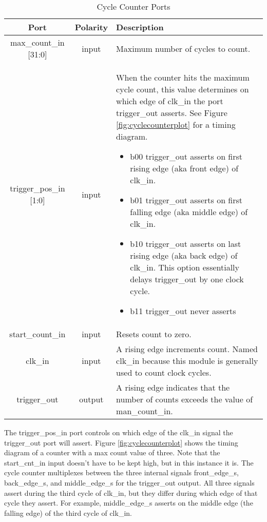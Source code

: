 \documentclass[]{report}
\begin{document}
\begin{table}[h]
	\centering
	\caption{Cycle Counter Ports}
	\label{table: cyc cnt ports}
	\begin{tabular}{|c|c|p{10cm}|}
		\hline 
		Port & Polarity & Description \\ 
		\hline 
		max\_count\_in [31:0] & input & Maximum number of cycles to count.\\ 
		\hline 
		trigger\_pos\_in [1:0] & input &  When the counter hits the maximum cycle count, this value determines on which edge of clk\_in the port trigger\_out asserts. See Figure \ref{fig:cyclecounterplot} for a timing diagram.
		\begin{itemize}
			\item b00 trigger\_out asserts on first rising edge (aka front edge) of clk\_in.
			\item b01 trigger\_out asserts on first falling edge (aka middle edge) of clk\_in.
			\item b10 trigger\_out asserts on last rising edge (aka back edge) of clk\_in. This option essentially delays trigger\_out by one clock cycle.
			\item b11 trigger\_out never asserts
		\end{itemize} \\ 
		\hline 
		start\_count\_in & input & Resets count to zero.\\ 
		\hline 
		clk\_in & input &  A rising edge increments count. Named clk\_in because this module is generally used to count clock cycles. \\ 
		\hline 
		trigger\_out & output & A rising edge indicates that the number of counts exceeds the value of man\_count\_in.\\ 
		\hline 
	\end{tabular} 
\end{table}

The trigger\_pos\_in port controls on which edge of the clk\_in signal the trigger\_out port will assert. Figure \ref{fig:cyclecounterplot} shows the timing diagram of a counter with a max count value of three. Note that the start\_cnt\_in input doesn't have to be kept high, but in this instance it is. The cycle counter multiplexes between the three internal signals front\_edge\_s, back\_edge\_s, and middle\_edge\_s for the trigger\_out output. All three signals assert during the third cycle of clk\_in, but they differ during which edge of that cycle they assert. For example, middle\_edge\_s asserts on the middle edge (the falling edge) of the third cycle of clk\_in.
\end{document}

